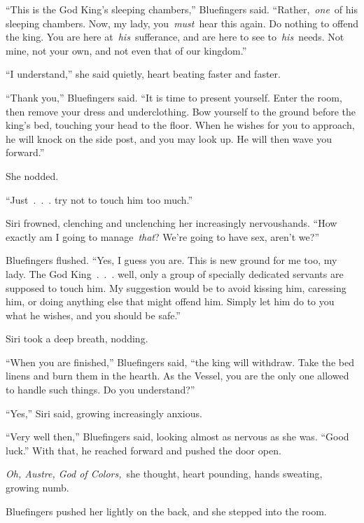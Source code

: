 “This is the God King’s sleeping chambers,” Bluefingers said. “Rather,~\textit{one}~of his sleeping chambers. Now, my lady, you~\textit{must}~hear this again. Do nothing to offend the king. You are here at~\textit{his}~sufferance, and are here to see to~\textit{his}~needs. Not mine, not your own, and not even that of our kingdom.”

“I understand,” she said quietly, heart beating faster and faster.

“Thank you,” Bluefingers said. “It is time to present yourself. Enter the room, then remove your dress and underclothing. Bow yourself to the ground before the king’s bed, touching your head to the floor. When he wishes for you to approach, he will knock on the side post, and you may look up. He will then wave you forward.”

She nodded.

“Just~.~.~. try not to touch him too much.”

Siri frowned, clenching and unclenching her increasingly nervoushands. “How exactly am I going to manage~\textit{that}? We’re going to have sex, aren’t we?”

Bluefingers flushed. “Yes, I guess you are. This is new ground for me too, my lady. The God King~.~.~. well, only a group of specially dedicated servants are supposed to touch him. My suggestion would be to avoid kissing him, caressing him, or doing anything else that might offend him. Simply let him do to you what he wishes, and you should be safe.”

Siri took a deep breath, nodding.

“When you are finished,” Bluefingers said, “the king will withdraw. Take the bed linens and burn them in the hearth. As the Vessel, you are the only one allowed to handle such things. Do you understand?”

“Yes,” Siri said, growing increasingly anxious.

“Very well then,” Bluefingers said, looking almost as nervous as she was. “Good luck.” With that, he reached forward and pushed the door open.

\textit{Oh, Austre, God of Colors,}~she thought, heart pounding, hands sweating, growing numb.

Bluefingers pushed her lightly on the back, and she stepped into the room.

